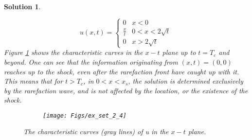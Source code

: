 \documentclass[10pt,letterpaper]{article}
\theoremstyle{break}
\newtheorem{solution}{Solution}
\begin{document}
\begin{solution}
\begin{itemize}
    $$
    u(x, t)=\left\{\begin{array}{ll}
    0 & x<0 \\
    \frac{x}{t} & 0<x<2 \sqrt{t} \\
    0 & x>2 \sqrt{t}
    \end{array}\right.
    $$
    Figure \ref{problem3_part2} shows the characteristic curves in the $x-t$ plane up to $t=T_{c}$ and beyond. One can see that the information originating from $(x, t)=(0,0)$ reaches up to the shock, even after the rarefaction front have caught up with it. This means that for $t>T_{c}$, in $0<x<x_{s}$, the solution is determined exclusively by the rarefaction wave, and is not affected by the location, or the existence of the shock.
    
    \begin{figure}
        \centering
        \begin{subfigure}[b]{0.5\textwidth}
            \texttt{[image: Figs/ex\_set\_2\_4]}
        \end{subfigure}
        \caption{The characteristic curves (gray lines) of u in the $x-t$ plane.}
        \label{problem3_part2}
    \end{figure}
    \end{itemize}
    
    
\end{solution}
\end{document}
